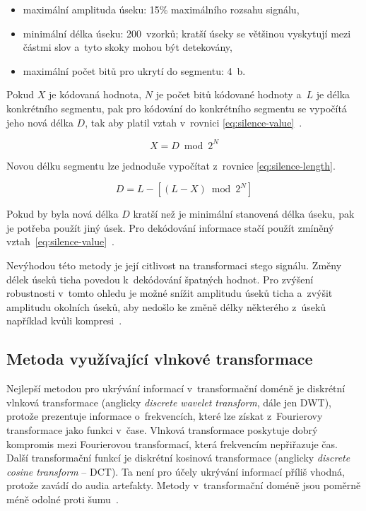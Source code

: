 \begin{itemize}
    \item maximální amplituda úseku: 15\% maximálního rozsahu signálu,
    \item minimální délka úseku: 200~vzorků; kratší úseky se většinou vyskytují
        mezi částmi slov a~tyto skoky mohou být detekovány,
    \item maximální počet bitů pro ukrytí do segmentu: 4~b.
\end{itemize}

\noindent Pokud $X$ je kódovaná hodnota, $N$ je počet bitů kódované hodnoty
a~$L$ je délka konkrétního segmentu, pak pro kódování do konkrétního segmentu
se vypočítá jeho nová délka $D$, tak aby platil vztah v~rovnici
\ref{eq:silence-value}~\cite{Shahreza2008}.

\begin{equation}
    \label{eq:silence-value}
    X = D \bmod 2^N
\end{equation}

\noindent Novou délku segmentu lze jednoduše vypočítat z~rovnice
\ref{eq:silence-length}.

\begin{equation}
    \label{eq:silence-length}
    D = L - [(L - X) \bmod 2^N]
\end{equation}

\noindent Pokud by byla nová délka $D$ kratší než je minimální stanovená délka
úseku, pak je potřeba použít jiný úsek. Pro dekódování informace stačí použít
zmíněný vztah~\ref{eq:silence-value}~\cite{Shahreza2008}.

Nevýhodou této metody je její citlivost na transformaci stego signálu. Změny
délek úseků ticha povedou k~dekódování špatných hodnot. Pro zvýšení robustnosti
v~tomto ohledu je možné snížit amplitudu úseků ticha a~zvýšit amplitudu
okolních úseků, aby nedošlo ke změně délky některého z~úseků například kvůli
kompresi~\cite{Djebbar2012}.

\subsection*{Metoda využívající vlnkové transformace}
\label{sub:wavelet-transform}

Nejlepší metodou pro ukrývání informací v~transformační doméně je diskrétní
vlnková transformace (anglicky \textit{discrete wavelet transform}, dále jen
DWT), protože prezentuje informace o~frekvencích, které lze získat z~Fourierovy
transformace jako funkci v~čase. Vlnková transformace poskytuje dobrý kompromis
mezi Fourierovou transformací, která frekvencím nepřiřazuje čas. Další
transformační funkcí je diskrétní kosinová transformace (anglicky
\textit{discrete cosine transform} -- DCT). Ta není pro účely ukrývání
informací příliš vhodná, protože zavádí do audia artefakty. Metody
v~transformační doméně jsou poměrně méně odolné proti šumu~\cite{Dutta2020}.

